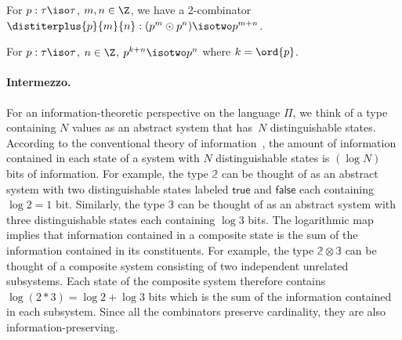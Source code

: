 \begin{lemma}
\label{lem:distiterplus}
  For $p : \tau\iso\tau$, $m,n\in\Z$, we have a 2-combinator
  $\distiterplus{p}{m}{n} : (p^m \odot p^n) \isotwo p ^{m + n}$.
\end{lemma}

\begin{lemma}
  For $p : \tau \iso \tau$, $n \in \Z$, $p^{k + n} \isotwo p^n$ where
  $k = \ord{p}$.
\end{lemma}

\paragraph*{Intermezzo.} For an information-theoretic perspective on
the language $\Pi$, we think of a type containing $N$ values as an
abstract system that has~$N$ distinguishable states. According to the
conventional theory of information~\cite{Shannon1948}, the amount of
information contained in each state of a system with $N$
distinguishable states is $(\log N)$ bits of information. For example,
the type $\mathbb{2}$ can be thought of as an abstract system with
two distinguishable states labeled $\mathsf{true}$ and
$\mathsf{false}$ each containing $\log 2 = 1$ bit. Similarly, the type
$\mathbb{3}$ can be thought of as an abstract system with three
distinguishable states each containing $\log 3$ bits. The logarithmic
map implies that information contained in a composite state is the sum
of the information contained in its constituents. For example, the
type $\mathbb{2} \otimes \mathbb{3}$ can be thought of a composite
system consisting of two independent unrelated subsystems. Each state
of the composite system therefore contains
$\log (2 * 3) = \log 2 + \log 3$ bits which is the sum of the
information contained in each subsystem. Since all the combinators
preserve cardinality, they are also information-preserving.

